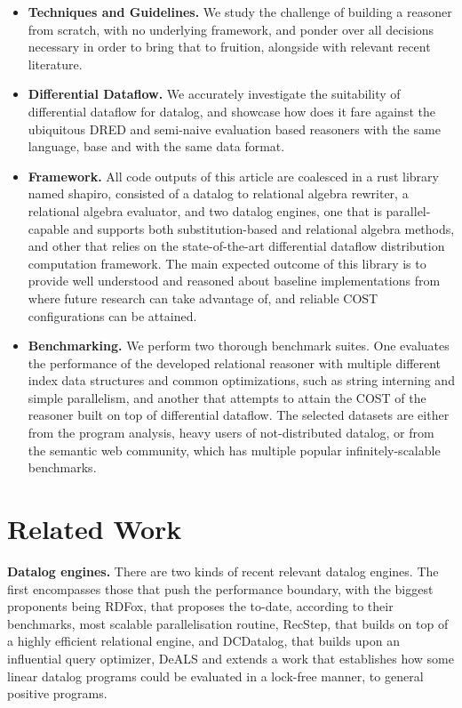 \documentclass[manuscript,screen,review]{acmart}
\theoremstyle{definition}
\begin{document}
\begin{itemize}
	\item \textbf{Techniques and Guidelines.} We study the challenge of building a reasoner from scratch,
	      with no underlying framework, and ponder over all decisions necessary in order to bring that to fruition,
	      alongside with relevant recent literature.
	\item \textbf{Differential Dataflow.} We accurately investigate the suitability of differential
	      dataflow for datalog, and showcase how does it fare against the ubiquitous DRED and semi-naive
	      evaluation based reasoners with the same language, base and with the same data format.
	\item \textbf{Framework.} All code outputs of this article are coalesced in a rust library named shapiro,
	      consisted of a datalog to relational algebra rewriter, a relational algebra evaluator, and two datalog engines,
	      one that is parallel-capable and supports both substitution-based and relational algebra methods, and other that
	      relies on the state-of-the-art differential dataflow\cite{differential_dataflow} distribution computation framework.
	      The main expected outcome of this library is to provide well understood and reasoned about baseline implementations
	      from where future research can take advantage of, and reliable COST configurations can be attained.
	\item \textbf{Benchmarking.} We perform two thorough benchmark suites. One evaluates the performance of the developed
	      relational reasoner with multiple different index data structures and common optimizations, such as string interning
	      and simple parallelism, and another that attempts to attain the COST of the reasoner built on top of differential
	      dataflow. The selected datasets are either from the program analysis, heavy users of not-distributed datalog, or from
	      the semantic web community, which has multiple popular infinitely-scalable benchmarks.
\end{itemize}

\section{Related Work}

\textbf{Datalog engines.} There are two kinds of recent relevant datalog engines. The first encompasses
those that push the performance boundary, with the biggest proponents being RDFox\cite{rdfox}, that
proposes the to-date, according to their benchmarks, most scalable parallelisation routine, RecStep\cite{recstep},
that builds on top of a highly efficient relational engine, and DCDatalog\cite{dcdatalog}, that builds upon
an influential query optimizer, DeALS\cite{deals} and extends a work that establishes how some linear
datalog programs could be evaluated in a lock-free manner, to general positive programs.
\end{document}
